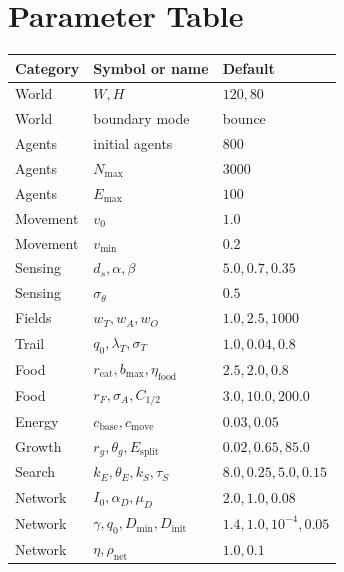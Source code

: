 \documentclass[11pt]{article}
\begin{document}
\section{Parameter Table}
\begin{center}
\begin{tabular}{lll}
\toprule
Category & Symbol or name & Default \\
\midrule
World & $W,H$ & $120,80$ \\
World & boundary mode & bounce \\
Agents & initial agents & $800$ \\
Agents & $N_{\max}$ & $3000$ \\
Agents & $E_{\max}$ & $100$ \\
Movement & $v_0$ & $1.0$ \\
Movement & $v_{\min}$ & $0.2$ \\
Sensing & $d_s,\alpha,\beta$ & $5.0,0.7,0.35$ \\
Sensing & $\sigma_\theta$ & $0.5$ \\
Fields & $w_T,w_A,w_O$ & $1.0,2.5,1000$ \\
Trail & $q_0,\lambda_T,\sigma_T$ & $1.0,0.04,0.8$ \\
Food & $r_{\mathrm{eat}},b_{\max},\eta_{\mathrm{food}}$ & $2.5,2.0,0.8$ \\
Food & $r_F,\sigma_A,C_{1/2}$ & $3.0,10.0,200.0$ \\
Energy & $c_{\mathrm{base}},c_{\mathrm{move}}$ & $0.03,0.05$ \\
Growth & $r_g,\theta_g,E_{\mathrm{split}}$ & $0.02,0.65,85.0$ \\
Search & $k_E,\theta_E,k_S,\tau_S$ & $8.0,0.25,5.0,0.15$ \\
Network & $I_0,\alpha_D,\mu_D$ & $2.0,1.0,0.08$ \\
Network & $\gamma,q_0,D_{\min},D_{\mathrm{init}}$ & $1.4,1.0,10^{-4},0.05$ \\
Network & $\eta,\rho_{\mathrm{net}}$ & $1.0,0.1$ \\
\bottomrule
\end{tabular}
\end{center}
\end{document}
